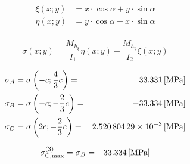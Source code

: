 \begin{align*}
	\xi(x;y) &= x\cdot \cos\alpha + y\cdot \sin\alpha \\
	\eta(x;y) &= y\cdot \cos\alpha - x\cdot \sin\alpha \\
\end{align*}

\begin{equation*}
	\sigma(x;y) = \frac{M_{h_\xi}}{I_1}\eta(x;y) - \frac{M_{h_\eta}}{I_2}\xi(x;y)
\end{equation*}

\begin{align*}
	\sigma_A &= \sigma\left(-c;\frac{4}{3}c\right) = &\SI{33,331}{[\mega\pascal]} \\
	\sigma_B &= \sigma\left(-c;-\frac{2}{3}c\right) = &\SI{-33,334}{[\mega\pascal]} \\
	\sigma_C &= \sigma\left(2c;-\frac{2}{3}c\right) = &\SI{2.52080429e-3}{[\mega\pascal]}
\end{align*}

\begin{equation*}
	\sigma^{(3)}_\text{C,max} = \sigma_B = \SI{-33.334}{[\mega\pascal]}
\end{equation*}

